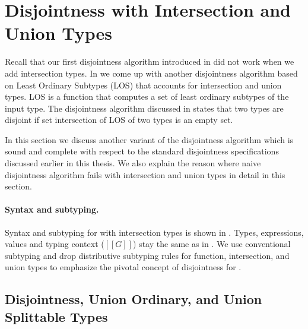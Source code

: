 





\section{Disjointness with Intersection and Union Types}
\label{sec:union:disj:union:inter}

Recall that our first disjointness algorithm introduced in  
did not work when we add intersection types.
In  we come up with
another disjointness algorithm based on
Least Ordinary Subtypes (LOS) 
that accounts for intersection
and union types. LOS is a function that computes
a set of least ordinary subtypes of the input type.
The disjointness algorithm discussed in  
states that two types are disjoint if set intersection 
of LOS of two types is an empty set.

In this section we discuss another variant of the disjointness 
algorithm which is sound and complete with respect to the 
standard disjointness specifications discussed earlier in 
this thesis. We also explain the 
reason where naive disjointness algorithm fails with 
intersection and union types in detail in this section.

\paragraph{Syntax and subtyping.}
Syntax and subtyping for \name with intersection types is shown in
. Types, expressions, values and
typing context ($[[G]]$) stay the same as in .
We use conventional subtyping and drop
distributive subtyping rules for function, intersection, and
union types to emphasize the pivotal concept of disjointness
for \name.


\subsection{Disjointness, Union Ordinary, and Union Splittable Types}

